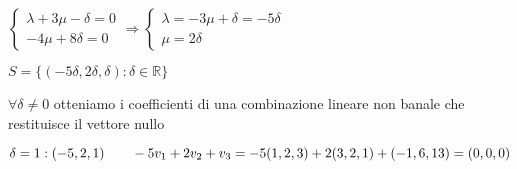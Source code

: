\documentclass{article}
\newcommand{\R}{\mathbb{R}}
\begin{document}
\begin{enumerate}
\begin{enumerate}
		    $\begin{cases}
				  \lambda+3\mu-\delta=0 \\
				  -4\mu+8\delta=0
			  \end{cases}\Rightarrow
			  \begin{cases}
				  \lambda=-3\mu+\delta=-5\delta \\
				  \mu=2\delta
			  \end{cases}$

		    $S=\{(-5\delta,2\delta,\delta):\delta\in\R\}$

		    $\forall\delta\not=0$ otteniamo i coefficienti di una combinazione lineare non banale che restituisce il vettore nullo

		    $\delta=1:(-5,2,1)\\\qquad-5v_1+2v_2+v_3=-5(1,2,3)+2(3,2,1)+(-1,6,13)=(0,0,0)$
	  \end{enumerate}
\end{enumerate}
\end{document}
